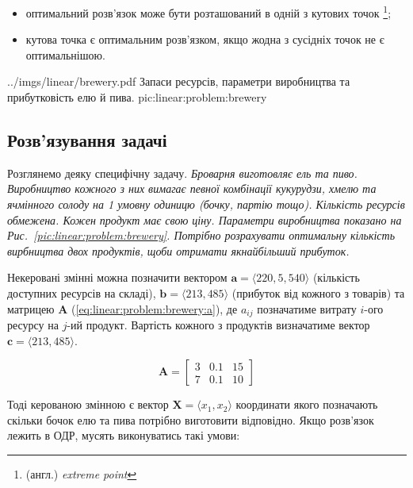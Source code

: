 \documentclass[\main/book.tex]{subfiles}
\begin{document}
\begin{conclusions}
\begin{itemize}
 \item оптимальний розв'язок може бути розташований в одній з кутових точок \footnote{(англ.) \textit{extreme point}};
 \item кутова точка є оптимальним розв'язком, якщо жодна з сусідніх точок не є оптимальнішою.
\end{itemize}
\label{conclusion:linear:optimal_solution}
\end{conclusions}

\illustration
 {../imgs/linear/brewery.pdf}
 {Запаси ресурсів, параметри ви\-роб\-ниц\-тва та прибутковість елю й пива.}
 {pic:linear:problem:brewery}

\subsection{Розв'язування задачі}

Розглянемо деяку специфічну задачу. \textit{Броварня виготовляє ель та пиво. Виробництво кожного з них вимагає певної комбінації кукурудзи, хмелю та ячмінного солоду на 1 умовну одиницю (бочку, партію тощо). Кількість ресурсів обмежена. Кожен продукт має свою ціну. Параметри виробництва показано на Рис.~\ref{pic:linear:problem:brewery}. Потрібно розрахувати оптимальну кількість вирбництва двох продуктів, щоби отримати якнайбільший прибуток.}

Некеровані змінні можна позначити вектором $\mathbf{a} = {\langle 220, 5, 540 \rangle}$ (кількість доступних ресурсів на складі), $\mathbf{b} = {\langle 213, 485 \rangle}$ (прибуток від кожного з товарів) та матрицею $\mathbf{A}$ (\ref{eq:linear:problem:brewery:a}), де $a_{ij}$ позначатиме витрату $i$-ого ресурсу на $j$-ий продукт. Вартість кожного з продуктів визначатиме вектор $\mathbf{c} = {\langle 213, 485 \rangle}$.

\begin{equation}
 \mathbf{A} = \begin{bmatrix}
               3 & 0.1 & 15 \\
               7 & 0.1 & 10
              \end{bmatrix}
 \label{eq:linear:problem:brewery:a}
\end{equation}

Тоді керованою змінною є вектор $\mathbf{X} = \langle x_1, x_2 \rangle$ координати якого позначають скільки бочок елю та пива потрібно виготовити відповідно. Якщо розв'язок лежить в ОДР, мусять виконуватись такі умови:
\end{document}
